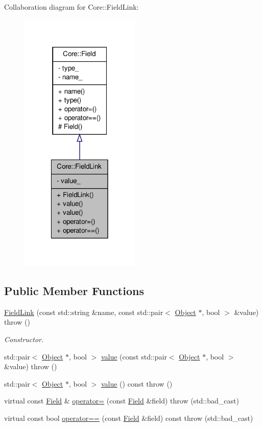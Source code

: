 Collaboration diagram for Core::FieldLink:
\nopagebreak
\begin{figure}[H]
\begin{center}
\leavevmode
\includegraphics[width=162pt]{dd/dad/classCore_1_1FieldLink__coll__graph}
\end{center}
\end{figure}
\subsection*{Public Member Functions}
\begin{DoxyCompactItemize}
\item 
\hyperlink{classCore_1_1FieldLink_a54d7afaa568554c610dd2d404ee73a4f}{FieldLink} (const std::string \&name, const std::pair$<$ \hyperlink{classCore_1_1Object}{Object} $\ast$, bool $>$ \&value)  throw ()
\begin{DoxyCompactList}\small\item\em Constructor. \item\end{DoxyCompactList}\item 
std::pair$<$ \hyperlink{classCore_1_1Object}{Object} $\ast$, bool $>$ \hyperlink{classCore_1_1FieldLink_a0b43b80b0e6f7aeb08b763051bde0b80}{value} (const std::pair$<$ \hyperlink{classCore_1_1Object}{Object} $\ast$, bool $>$ \&value)  throw ()
\item 
std::pair$<$ \hyperlink{classCore_1_1Object}{Object} $\ast$, bool $>$ \hyperlink{classCore_1_1FieldLink_add648c4cde8a23233384ca213874cf0d}{value} () const   throw ()
\item 
virtual const \hyperlink{classCore_1_1Field}{Field} \& \hyperlink{classCore_1_1FieldLink_a3690c623f44e77dee5a70dd13e713a76}{operator=} (const \hyperlink{classCore_1_1Field}{Field} \&field)  throw (std::bad\_\-cast)
\item 
virtual const bool \hyperlink{classCore_1_1FieldLink_abffb8e3af41aabd4d82671e6e6cefb14}{operator==} (const \hyperlink{classCore_1_1Field}{Field} \&field) const   throw (std::bad\_\-cast)
\end{DoxyCompactItemize}


